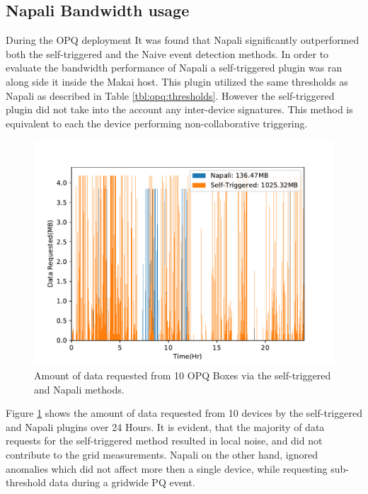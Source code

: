 \subsection{Napali Bandwidth usage} \label{iexp:sec:band}
During the OPQ deployment It was found that Napali significantly outperformed both the self-triggered and the Naive event detection methods.
In order to evaluate the bandwidth performance of Napali a self-triggered plugin was ran along side it inside the Makai host.
This plugin utilized the same thresholds as Napali as described in Table \ref{tbl:opq:thresholds}.
However the self-triggered plugin did not take into the account any inter-device signatures.
This method is equivalent to each the device performing non-collaborative triggering.
\begin{figure}[h]
    \centering
    \includegraphics[width=0.8\linewidth]{img/napali_eval/napali_request_bandwidth.pdf}
    \caption{Amount of data requested from 10 OPQ Boxes via the self-triggered and Napali methods.}
    \label{expdes:fig:self_triggered_bandwidth}
\end{figure}

Figure \ref{expdes:fig:self_triggered_bandwidth} shows the amount of data requested from 10 devices by the self-triggered and Napali plugins over 24 Hours.
It is evident, that the majority of data requests for the self-triggered method resulted in local noise, and did not contribute to the grid measurements.
Napali on the other hand, ignored anomalies which did not affect more then a single device, while requesting sub-threshold data during a gridwide PQ event.

